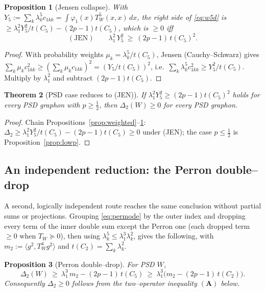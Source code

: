 \documentclass[11pt]{article}
\newtheorem{theorem}{Theorem}[section]
\newtheorem{proposition}[theorem]{Proposition}
\theoremstyle{definition}
\newcommand{\tw}{T_W}
\begin{document}
\begin{proposition}[Jensen collapse]\label{prop:jensen}
With $Y_5:=\sum_k\lambda_k^5 c_{1kk}=\int\varphi_1(x)\tw^5(x,x)\,dx$, the
right side of \eqref{eq:w5d} is $\ge \lambda_1^2 Y_5^2/t(C_5)-(2p-1)t(C_5)$, which
is $\ge0$ iff
\begin{equation}\label{eq:jen}
  (\mathrm{JEN})\qquad \lambda_1^2\,Y_5^2\ \ge\ (2p-1)\,t(C_5)^2 .
\end{equation}
\end{proposition}

\begin{proof}
With probability weights $\mu_k=\lambda_k^5/t(C_5)$, Jensen (Cauchy--Schwarz) gives
$\sum_k\mu_k c_{1kk}^2\ge(\sum_k\mu_k c_{1kk})^2=(Y_5/t(C_5))^2$, i.e.\
$\sum_k\lambda_k^5 c_{1kk}^2\ge Y_5^2/t(C_5)$.  Multiply by $\lambda_1^2$ and
subtract $(2p-1)t(C_5)$.
\end{proof}

\begin{theorem}[PSD case reduces to (JEN)]\label{thm:reduction}
If $\lambda_1^2 Y_5^2\ge(2p-1)t(C_5)^2$ holds for every PSD graphon with
$p\ge\tfrac12$, then $\Delta_2(W)\ge0$ for every PSD graphon.
\end{theorem}

\begin{proof}
Chain Propositions~\ref{prop:weighted}--\ref{prop:jensen}:
$\Delta_2\ge\lambda_1^2Y_5^2/t(C_5)-(2p-1)t(C_5)\ge0$ under (JEN); the case
$p\le\tfrac12$ is Proposition~\ref{prop:lowp}.
\end{proof}

\subsection{An independent reduction: the Perron double--drop}

A second, logically independent route reaches the same conclusion without partial
sums or projections.  Grouping \eqref{eq:permode} by the outer index and dropping
every term of the inner double sum except the Perron one (each dropped term
$\ge0$ when $\tw\succeq0$), then using $\lambda_k^5\le\lambda_1^3\lambda_k^2$,
gives the following, with $m_2:=\langle g^2,\tw^4 g^2\rangle$ and
$t(C_2)=\sum_k\lambda_k^2$.

\begin{proposition}[Perron double--drop]\label{prop:doubledrop}
For PSD $W$,
\[
  \Delta_2(W)\ \ge\ \lambda_1^3\,m_2-(2p-1)\,t(C_5)
  \ \ge\ \lambda_1^3\Big(m_2-(2p-1)\,t(C_2)\Big).
\]
Consequently $\Delta_2\ge0$ follows from the two--operator inequality
$(\mathbf A)$ below.
\end{proposition}
\end{document}
